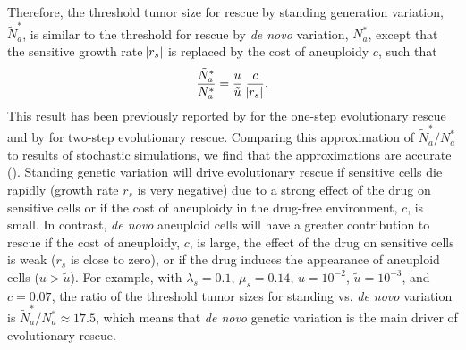 \documentclass[12pt]{extarticle}
\renewcommand{\Delta}{r}
\begin{document}
Therefore, the threshold tumor size for rescue by standing generation variation, $\tilde{N}^*_{a}$, is similar to the threshold for rescue by \textit{de novo} variation, $N^*_a$, except that the sensitive growth rate $\abs{\Delta_s}$ is replaced by the cost of aneuploidy $c$, such that
\begin{equation}\label{eq:Nsgv}
\frac{\tilde{N}^*_{a}}{N^*_{a}} = \frac{u}{\tilde{u}} \; \frac{c}{\abs{\Delta_s}}.
\end{equation}
This result has been previously reported by \citet{orr2008population} for the one-step evolutionary rescue and by \citet{martin2013probability} for two-step evolutionary rescue. %
Comparing this approximation of $\tilde{N}^*_{a}/N^*_{a}$ to results of stochastic simulations, we find that the approximations are accurate (). 
Standing genetic variation will drive evolutionary rescue if sensitive cells die rapidly (growth rate $\Delta_s$ is very negative) due to a strong effect of the drug on sensitive cells or if the cost of aneuploidy in the drug-free environment, $c$, is small.  
In contrast, \textit{de novo} aneuploid cells will have a greater contribution to rescue if the cost of aneuploidy, $c$, is large, the effect of the drug on sensitive cells is weak ($\Delta_s$ is close to zero), or if the drug induces the appearance of aneuploid cells ($u > \tilde u$).
For example, with  $\lambda_s=0.1$, $\mu_s=0.14$, $u=10^{-2}$, $\tilde{u}=10^{-3}$, and $c=0.07$, the ratio of the threshold tumor sizes for standing vs. \textit{de novo} variation is $\tilde{N}^*_a/N^*_a \approx 17.5$, which means that \textit{de novo} genetic variation is  the main driver of evolutionary rescue.
\end{document}
